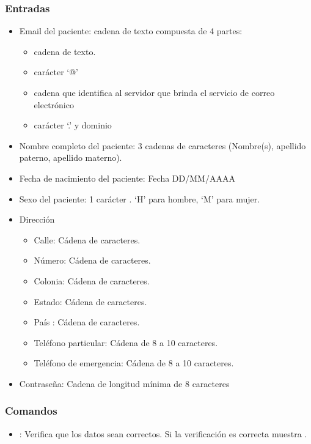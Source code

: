 \subsubsection{Entradas}
\begin{itemize}
\item Email del paciente: cadena de texto compuesta de 4 partes:  
            \begin{itemize}
                \item cadena de texto.
                \item carácter ‘@’
                \item cadena que identifica al servidor que brinda el servicio de correo electrónico
                \item carácter ‘.’ y dominio
            \end{itemize}
            \item Nombre completo del paciente:  3 cadenas de caracteres (Nombre(s), apellido paterno, apellido materno).
            \item Fecha de nacimiento del paciente: Fecha DD/MM/AAAA
            \item Sexo del paciente: 1 carácter . ‘H’ para hombre, ‘M’ para mujer.
            \item Dirección
            \begin{itemize}
                \item Calle: Cádena de caracteres.
                \item Número: Cádena de caracteres.
                \item Colonia: Cádena de caracteres.
                \item Estado: Cádena de caracteres.
                \item País : Cádena de caracteres.
                \item Teléfono particular: Cádena de 8 a 10 caracteres.
                \item Teléfono de emergencia: Cádena de 8 a 10 caracteres.
            \end{itemize}    
            \item Contraseña:  Cadena de longitud mínima de 8 caracteres

\end{itemize}

\subsubsection{Comandos}
\begin{itemize}
    \item {}:  Verifica que los datos sean correctos. Si la verificación es correcta muestra .  
\end{itemize}

